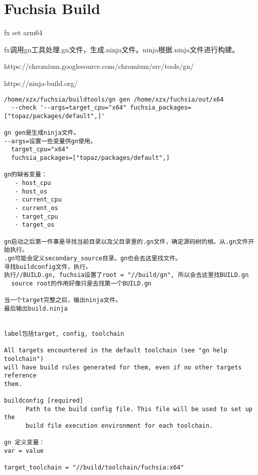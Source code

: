 \section{Fuchsia Build}

fx set arm64

fx调用gn工具处理.gn文件，生成.ninja文件。ninja根据.ninja文件进行构建。

https://chromium.googlesource.com/chromium/src/tools/gn/

https://ninja-build.org/

\begin{verbatim}
/home/xzx/fuchsia/buildtools/gn gen /home/xzx/fuchsia/out/x64 
  --check '--args=target_cpu="x64" fuchsia_packages=["topaz/packages/default",]'

gn gen是生成ninja文件。
--args=设置一些变量供gn使用。
  target_cpu="x64" 
  fuchsia_packages=["topaz/packages/default",]

gn的缺省变量：
   - host_cpu
   - host_os
   - current_cpu
   - current_os
   - target_cpu
   - target_os

gn启动之后第一件事是寻找当前目录以及父目录里的.gn文件，确定源码树的根。从.gn文件开始执行。
.gn可能会定义secondary_source目录。gn也会去这里找文件。
寻找buildconfig文件，执行。
执行//BUILD.gn, fuchsia设置了root = "//build/gn", 所以会去这里找BUILD.gn
  source root的作用好像只是去找第一个BUILD.gn

当一个target完整之后，输出ninja文件。
最后输出build.ninja


label包括target, config, toolchain

All targets encountered in the default toolchain (see "gn help toolchain")
will have build rules generated for them, even if no other targets reference
them.

buildconfig [required]
      Path to the build config file. This file will be used to set up the
      build file execution environment for each toolchain.

gn 定义变量：
var = value

target_toolchain = "//build/toolchain/fuchsia:x64"
\end{verbatim}